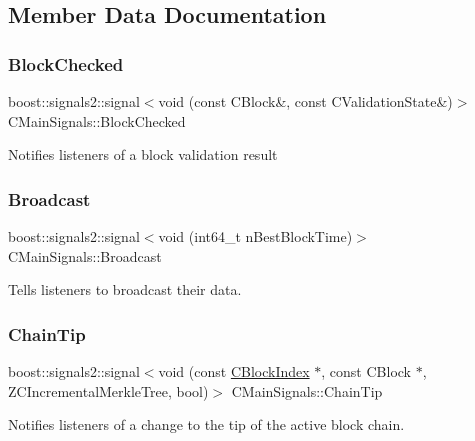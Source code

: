 \subsection{Member Data Documentation}
\mbox{\label{struct_c_main_signals_a9419bb09211f46bdc7f214e9d94f1bd7}} 
\subsubsection{\texorpdfstring{Block\+Checked}{BlockChecked}}
{\footnotesize\ttfamily boost\+::signals2\+::signal$<$void (const C\+Block\&, const C\+Validation\+State\&)$>$ C\+Main\+Signals\+::\+Block\+Checked}

Notifies listeners of a block validation result \mbox{\label{struct_c_main_signals_a57ba54e641838bc03d0bbda30796c0c9}} 
\subsubsection{\texorpdfstring{Broadcast}{Broadcast}}
{\footnotesize\ttfamily boost\+::signals2\+::signal$<$void (int64\+\_\+t n\+Best\+Block\+Time)$>$ C\+Main\+Signals\+::\+Broadcast}

Tells listeners to broadcast their data. \mbox{\label{struct_c_main_signals_abaf6911904d514ad1d9f2c81a4faa08b}} 
\subsubsection{\texorpdfstring{Chain\+Tip}{ChainTip}}
{\footnotesize\ttfamily boost\+::signals2\+::signal$<$void (const \mbox{\hyperlink{class_c_block_index}{C\+Block\+Index}} $\ast$, const C\+Block $\ast$, Z\+C\+Incremental\+Merkle\+Tree, bool)$>$ C\+Main\+Signals\+::\+Chain\+Tip}

Notifies listeners of a change to the tip of the active block chain. \mbox{\label{struct_c_main_signals_a1bb8e6808c2086e4045ecd8f356a12e4}} 
